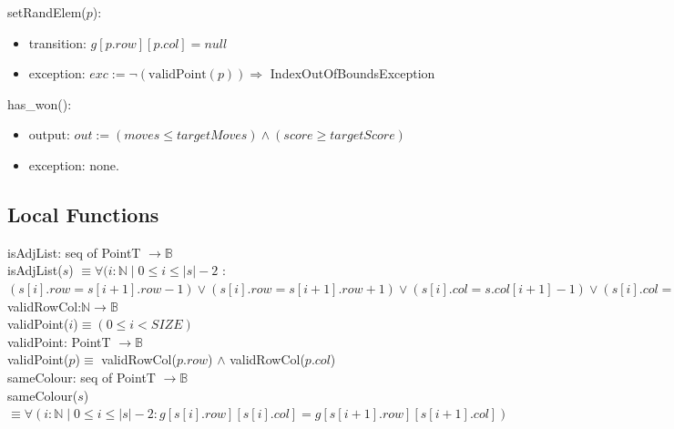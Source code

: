 \documentclass[12pt]{article}
\begin{document}
\noindent setRandElem($p$):

\begin{itemize}

\item transition: $g[p.row][p.col] = null$

\item exception: $exc:= \lnot (\mbox{validPoint}(p)) \Rightarrow$ IndexOutOfBoundsException

\end{itemize}

\noindent has\_won():

\begin{itemize}

\item output: $out:= (moves \le targetMoves) \land (score \ge targetScore)$

\item exception: none.

\end{itemize}

\newpage

\subsection*{Local Functions}

\noindent isAdjList: seq of PointT $\rightarrow \mathbb{B}$\\
isAdjList($s$) $\equiv \forall(i:\mathbb{N} \mid 0 \le i \le \lvert s\rvert - 2$ : $(s[i].row = s[i+1].row-1) \lor (s[i].row=s[i+1].row+1) \lor (s[i].col=s.col[i+1]-1) \lor (s[i].col=s[i+1].col+1) \land \lnot((s[i].row = s[i+1].row +1)\land (s[i].col = s[i+1].col+1))\land \lnot ((s[i].row = s[i+1].row-1)\land (s[i].col = s[i+1].col-1))$\\

\noindent validRowCol:$\mathbb{N} \rightarrow \mathbb{B}$\\
validPoint($i$)$ \equiv (0 \le i < SIZE)$\\

\noindent validPoint: PointT $\rightarrow \mathbb{B}$\\
validPoint($p$)$ \equiv $ validRowCol($p.row$) $\land$ validRowCol($p.col$) \\

\noindent sameColour: seq of PointT $\rightarrow \mathbb{B}$\\
sameColour($s$) $\equiv \forall(i:\mathbb{N} \mid 0 \le i \le \lvert s \rvert -2 : g[s[i].row][s[i].col]= g[s[i+1].row][s[i+1].col])$\\
\end{document}
